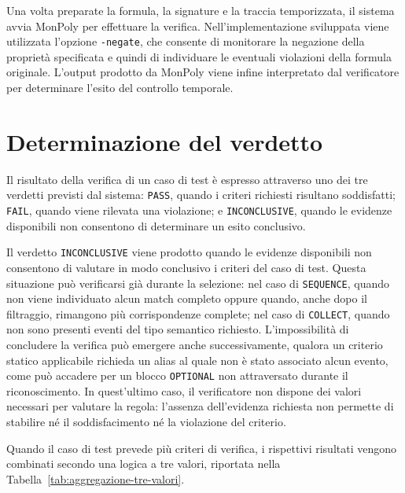 Una volta preparate la formula, la signature e la traccia temporizzata, il sistema avvia MonPoly per effettuare la verifica. Nell'implementazione sviluppata viene utilizzata l'opzione \texttt{-negate}, che consente di monitorare la negazione della proprietà specificata e quindi di individuare le eventuali violazioni della formula originale. L'output prodotto da MonPoly viene infine interpretato dal verificatore per determinare l'esito del controllo temporale.

\section{Determinazione del verdetto}\label{determinazione-del-verdetto}

Il risultato della verifica di un caso di test è espresso attraverso uno dei tre verdetti previsti dal sistema: \texttt{PASS}, quando i criteri richiesti risultano soddisfatti; \texttt{FAIL}, quando viene rilevata una violazione; e \texttt{INCONCLUSIVE}, quando le evidenze disponibili non consentono di determinare un esito conclusivo.

Il verdetto \texttt{INCONCLUSIVE} viene prodotto quando le evidenze disponibili non consentono di valutare in modo conclusivo i criteri del caso di test. Questa situazione può verificarsi già durante la selezione: nel caso di \texttt{SEQUENCE}, quando non viene individuato alcun match completo oppure quando, anche dopo il filtraggio, rimangono più corrispondenze complete; nel caso di \texttt{COLLECT}, quando non sono presenti eventi del tipo semantico richiesto. L'impossibilità di concludere la verifica può emergere anche successivamente, qualora un criterio statico applicabile richieda un alias al quale non è stato associato alcun evento, come può accadere per un blocco \texttt{OPTIONAL} non attraversato durante il riconoscimento. In quest'ultimo caso, il verificatore non dispone dei valori necessari per valutare la regola: l'assenza dell'evidenza richiesta non permette di stabilire né il soddisfacimento né la violazione del criterio.

Quando il caso di test prevede più criteri di verifica, i rispettivi risultati vengono combinati secondo una logica a tre valori, riportata nella Tabella~\ref{tab:aggregazione-tre-valori}.

